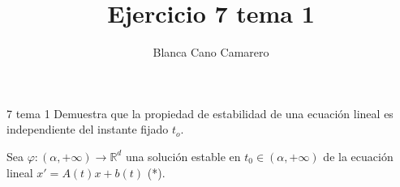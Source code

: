 \documentclass[a4paper , 14pt, spanish ]{article}
\begin{document}







\raggedright
\title{Ejercicio 7 tema 1}
\author{Blanca Cano Camarero}


\begin{table}[ht]

\end{table}%

\setlength{\parindent}{10ex} %

\begin{Proof}{7 tema 1}{}
Demuestra que la propiedad de estabilidad de una ecuación lineal es independiente del instante fijado $t_o$.
\end{Proof}


Sea $\varphi: (\alpha , + \infty) \rightarrow \mathbb R^d$ una  solución  estable en  $t_0 \in (\alpha, +\infty)$ de la ecuación lineal
$x' = A(t) x + b(t)$ (*).  \\ 
\end{document}
